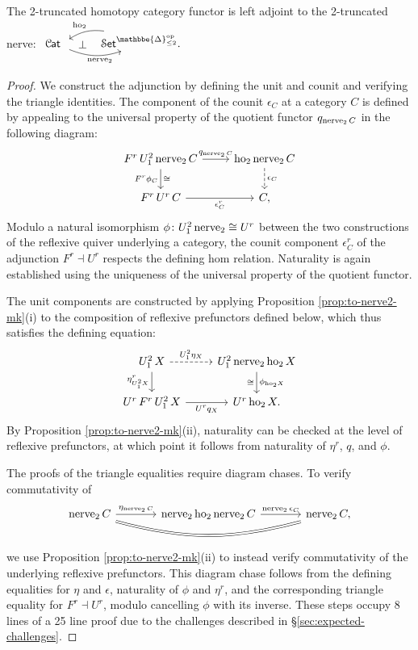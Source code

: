 \documentclass[a4paper,UKenglish,cleveref, autoref, thm-restate]{lipics-v2021}
\newcommand{\op}{\textup{op}}
\newcommand{\ho}{\textup{ho}}
\newcommand{\nerve}{\textup{nerve}}
\newcommand{\cat}[1]{\textup{\textsf{#1}}}%
\newcommand{\1}{\mathbbe{1}}
\newcommand{\2}{\mathbbe{2}}
\newcommand{\3}{\mathbbe{3}}
\newcommand{\DDelta}{\mathbbe{\Delta}}
\newcommand{\Cat}{\mathcal{C}{\kern-.75pt}\cat{at}}
\newcommand{\Set}{\mathcal{S}\cat{et}}
\newcommand{\cdocTwo}[3][]{\href{https://leanprover-community.github.io/mathlib4_docs/find/?pattern=CategoryTheory.#1#2\%E2\%82\%82#3\#doc}{\texttt{#2${}_2$#3}}}
\begin{document}
\begin{proposition}[\cdocTwo{nerve}{Adj}]\label{prop:2-truncated-nerve-adj}
The 2-truncated homotopy category functor is left adjoint to the 2-truncated nerve:
$ \begin{tikzcd} \Cat\ \arrow[r, bend right=20, "\nerve_2"' pos=.6] \arrow[r, phantom, "\bot"] & \Set^{\DDelta_{\leq 2}^\op}. \arrow[l, bend right=20, "\ho_2"' pos=.4] \end{tikzcd}$
\end{proposition}
\begin{proof}
We construct the adjunction by defining the unit and counit and verifying the triangle identities. The component of the counit $\epsilon_
C$ at a category $C$ is defined by appealing to the universal property of the quotient functor $q_{\nerve_2\, C}$ in the following diagram:
\[ \begin{tikzcd} F^r\, U^2_1\, \nerve_2\, C \arrow[r, "q_{\nerve_2\, C}"] \arrow[d, "F^r\phi_C"', "\cong"] & \ho_2\, \nerve_2\, C \arrow[d, dashed, "\epsilon_C"] \\ F^r\, U^r\, C \arrow[r, "\epsilon^r_C"'] & C, \end{tikzcd}\]
Modulo a natural isomorphism $\phi \colon U^2_1\,\nerve_2 \cong U^r$ between the two constructions of the reflexive quiver underlying a category, the counit component $\epsilon^r_C$ of the adjunction $F^r \dashv U^r$ respects the defining hom relation. Naturality is again established using the uniqueness of the universal property of the quotient functor.

The unit components are constructed by applying Proposition \ref{prop:to-nerve2-mk}(i) to the composition of reflexive prefunctors defined below, which thus satisfies the defining equation:
\[ \begin{tikzcd} U^2_1\, X \arrow[r, "U^2_1 \eta_X", dashed ] \arrow[d, "\eta^r_{U^2_1X}"'] & U^2_1\, \nerve_2\, \ho_2\, X \arrow[d, "\phi_{\ho_2 X}", "\cong"'] \\ U^r\, F^r\, U^2_1\, X \arrow[r, "U^rq_X"'] & U^r\, \ho_2\, X. \end{tikzcd} \] By Proposition \ref{prop:to-nerve2-mk}(ii), naturality can be checked at the level of reflexive prefunctors, at which point it follows from naturality of $\eta^r$, $q$, and $\phi$.

The proofs of the triangle equalities require diagram chases. To verify commutativity of
\[ \begin{tikzcd}[sep=large] \nerve_2\, C \arrow[r, "\eta_{\nerve_2\,C}"] \arrow[rr, bend right=15, equals] & \nerve_2\,\ho_2\,\nerve_2\, C \arrow[r, "\nerve_2\,\epsilon_C"] & \nerve_2\,C, \end{tikzcd}\]
we use Proposition \ref{prop:to-nerve2-mk}(ii) to instead verify commutativity of the underlying reflexive prefunctors. This diagram chase follows from the defining equalities for $\eta$ and $\epsilon$, naturality of $\phi$ and $\eta^r$, and   the corresponding triangle equality for $F^r \dashv U^r$, modulo cancelling $\phi$ with its inverse.  These steps occupy 8 lines of a 25 line proof due to the challenges described in \S\ref{sec:expected-challenges}.


\end{proof}
\end{document}
